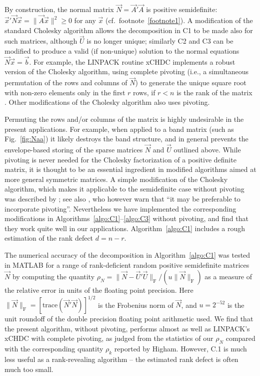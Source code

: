 \documentclass[structabstract]{aa}
\begin{document}
By construction, the normal matrix $\vec{N}=\vec{A}'\vec{A}$ is 
positive semidefinite: $\vec{x}'\vec{N}\vec{x}=\|\vec{A}\vec{x}\|^2\ge 0$ 
for any $\vec{x}$ (cf.\ footnote~\ref{footnote1}). A modification of the
standard Cholesky algorithm allows the decomposition in C1 to be made
also for such matrices, although $\vec{U}$ is no longer unique; similarly 
C2 and C3 can be modified to produce a valid (if non-unique) solution 
to the normal equations $\vec{N}\vec{x}=\vec{b}$. For example, the
LINPACK routine xCHDC \citep{LINPACK-UG} implements a robust
version of the Cholesky algorithm, using complete pivoting (i.e., a 
simultaneous permutation of the rows and columns of $\vec{N}$) 
to generate the unique square root with non-zero elements only in 
the first $r$ rows, if $r<n$ is the rank of the matrix 
\citep[for a detailed analysis, see][]{Higham:2002:ASN}.
Other modifications of the Cholesky algorithm 
\citep[e.g.,][]{schnabel+99} also uses pivoting.

Permuting the rows and/or columns of the matrix is highly 
undesirable in the present applications. For example, when applied 
to a band matrix (such as Fig.~\ref{fig:Naa}) it likely destroys the
band structure, and in general prevents the envelope-based storing
of the sparse matrices $\vec{N}$ and $\vec{U}$ outlined above.
While pivoting is never needed for the Cholesky factorization of a 
positive definite matrix, it is thought to be an essential ingredient 
in modified algorithms aimed at more general symmetric matrices. 
A simple modification of the Cholesky algorithm, which makes it 
applicable to the semidefinite case without pivoting was described
by \citet[][Eq.~19.5]{laws+74}; see also \citet[][Eq.~4.2.11]{golu+96}, 
who however warn that ``it may be preferable
to incorporate pivoting''. Nevertheless we have implemented the 
corresponding modifications in Algorithms~\ref{algo:C1}--\ref{algo:C3}
without pivoting, and find that they work quite well in our applications. 
Algorithm~\ref{algo:C1} includes a rough estimation of the rank defect 
$d=n-r$.

The numerical accuracy of the decomposition in Algorithm~\ref{algo:C1}
was tested in MATLAB for a range of rank-deficient random positive
semidefinite matrices $\vec{N}$ \citep[patterned after][]{higham1990} 
by computing the quantity
$\rho_N=\|\vec{N}-\vec{U}'\vec{U}\|_\text{F}/(u\|\vec{N}\|_\text{F})$
as a measure of the relative error in units of the floating point precision.
Here $\|\vec{N}\|_\text{F}=[\text{trace}(\vec{N}'\vec{N})]^{1/2}$ is
the Frobenius norm of $\vec{N}$, and $u=2^{-52}$ is the unit roundoff 
\citep{golu+96} of the double precision floating point arithmetic
used.  We find that the present algorithm, without 
pivoting, performs almost as well as LINPACK's xCHDC with complete 
pivoting, as judged from the statistics of our $\rho_N$ 
compared with the corresponding quantity $\rho_k$ reported by Higham.
However, C.1 is much less useful as a rank-revealing algorithm -- the 
estimated rank defect is often much too small.
\end{document}
